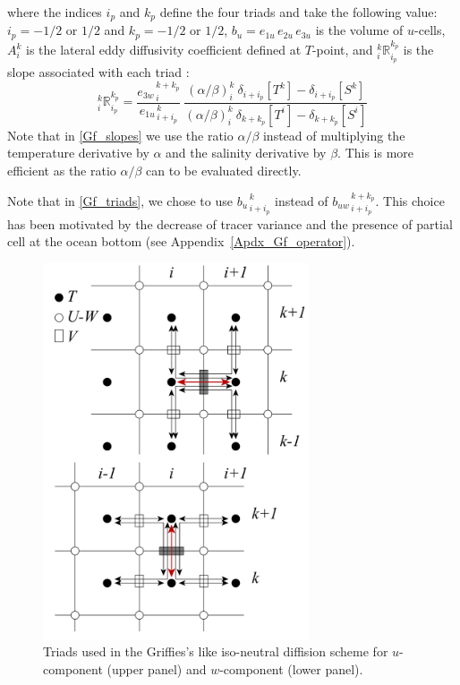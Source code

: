 where the indices $i_p$ and $k_p$ define the four triads and take the following value: 
$i_p = -1/2$ or $1/2$ and $k_p = -1/2$ or $1/2$, 
$b_u= e_{1u}\,e_{2u}\,e_{3u}$ is the volume of $u$-cells, 
$A_i^k$ is the lateral eddy diffusivity coefficient defined at $T$-point,
and $_i^k \mathbb{R}_{i_p}^{k_p}$ is the slope associated with each triad :
\begin{equation} \label{Gf_slopes}
_i^k \mathbb{R}_{i_p}^{k_p} 
=\frac{ {e_{3w}}_{\,i}^{\,k+k_p}} { {e_{1u}}_{\,i+i_p}^{\,k}} \ \frac 
{\left(\alpha / \beta \right)_i^k  \ \delta_{i + i_p}[T^k] - \delta_{i + i_p}[S^k] }
{\left(\alpha / \beta \right)_i^k  \ \delta_{k+k_p}[T^i ] - \delta_{k+k_p}[S^i ] }
\end{equation}
Note that in \eqref{Gf_slopes} we use the ratio $\alpha / \beta$ instead of 
multiplying the temperature derivative by $\alpha$ and the salinity derivative 
by $\beta$. This is more efficient as the ratio $\alpha / \beta$ can to be 
evaluated directly.

Note that in \eqref{Gf_triads}, we chose to use ${b_u}_{\,i+i_p}^{\,k}$ instead of 
${b_{uw}}_{\,i+i_p}^{\,k+k_p}$. This choice has been motivated by the decrease 
of tracer variance and the presence of partial cell at the ocean bottom 
(see Appendix~\ref{Apdx_Gf_operator}).

\begin{figure}[!ht] \label{Fig_ISO_triad}
\begin{center}
\includegraphics[width=0.70\textwidth]{./TexFiles/Figures/Fig_ISO_triad.pdf}
\caption{  \label{Fig_ISO_triad}   
Triads used in the Griffies's like iso-neutral diffision scheme for 
$u$-component (upper panel) and $w$-component (lower panel).}
\end{center}
\end{figure}

